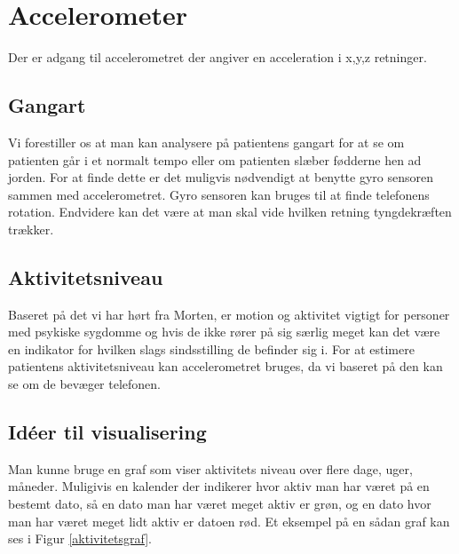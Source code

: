 \section{Accelerometer}
Der er adgang til accelerometret der angiver en acceleration i x,y,z retninger.

\subsection{Gangart}
Vi forestiller os at man kan analysere på patientens gangart for at se om patienten går i et normalt tempo eller om patienten slæber fødderne hen ad jorden.
For at finde dette er det muligvis nødvendigt at benytte gyro sensoren sammen med accelerometret.
Gyro sensoren kan bruges til at finde telefonens rotation.
Endvidere kan det være at man skal vide hvilken retning tyngdekræften trækker.

\subsection{Aktivitetsniveau}
Baseret på det vi har hørt fra Morten, er motion og aktivitet vigtigt for personer med psykiske sygdomme og hvis de ikke rører på sig særlig meget kan det være en indikator for hvilken slags sindsstilling de befinder sig i.
For at estimere patientens aktivitetsniveau kan accelerometret bruges, da vi baseret på den kan se om de bevæger telefonen. 



\subsection{Idéer til visualisering} 
Man kunne bruge en graf som viser aktivitets niveau over flere dage, uger, måneder. Muligivis en kalender der indikerer hvor aktiv man har været på en bestemt dato, så en dato man har været meget aktiv er grøn, og en dato hvor man har været meget lidt aktiv er datoen rød. Et eksempel på en sådan graf kan ses i Figur \ref{aktivitetsgraf}.

